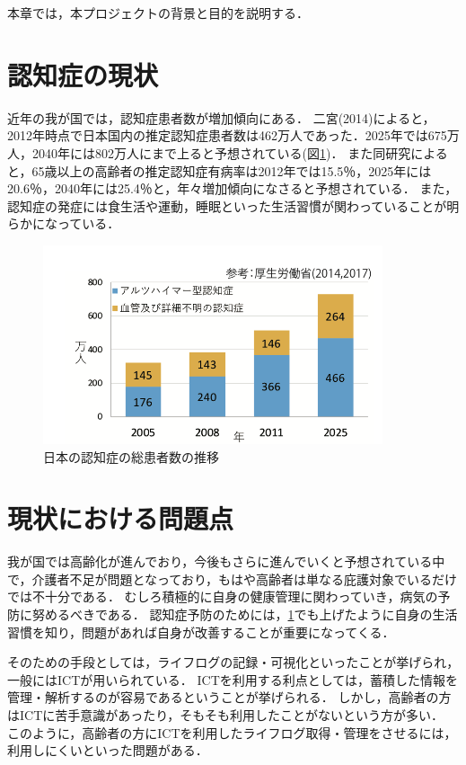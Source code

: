 \documentclass[../report]{subfiles}
\begin{document}
本章では，本プロジェクトの背景と目的を説明する．

\section{認知症の現状} \label{sec:genzyou}
近年の我が国では，認知症患者数が増加傾向にある．
二宮(2014)によると，2012年時点で日本国内の推定認知症患者数は462万人であった\cite{syourai}．2025年では675万人，2040年には802万人にまで上ると予想されている(図\ref{fig:ninchisyo-graph})．
また同研究によると，65歳以上の高齢者の推定認知症有病率は2012年では15.5％，2025年には20.6％，2040年には25.4％と，年々増加傾向になさると予想されている\cite{syourai}．
また，認知症の発症には食生活や運動，睡眠といった生活習慣が関わっていることが明らかになっている\cite{seikatsu}．
\begin{figure}[htbp]
    \begin{center}
        \includegraphics[width=10cm]{imgs/ninchisyo-graph.png}
        \caption{日本の認知症の総患者数の推移}
        \label{fig:ninchisyo-graph}
    \end{center}
\end{figure}

\section{現状における問題点} \label{sec:mondai}
我が国では高齢化が進んでおり，今後もさらに進んでいくと予想されている中で，介護者不足が問題となっており，もはや高齢者は単なる庇護対象でいるだけでは不十分である\cite{kaigo}．
むしろ積極的に自身の健康管理に関わっていき，病気の予防に努めるべきである．
認知症予防のためには，\ref{sec:genzyou}でも上げたように自身の生活習慣を知り，問題があれば自身が改善することが重要になってくる．

そのための手段としては，ライフログの記録・可視化といったことが挙げられ\cite{lifelog}， 一般にはICTが用いられている．
ICTを利用する利点としては，蓄積した情報を管理・解析するのが容易であるということが挙げられる．
しかし，高齢者の方はICTに苦手意識があったり，そもそも利用したことがないという方が多い．
このように，高齢者の方にICTを利用したライフログ取得・管理をさせるには，利用しにくいといった問題がある．
\end{document}
